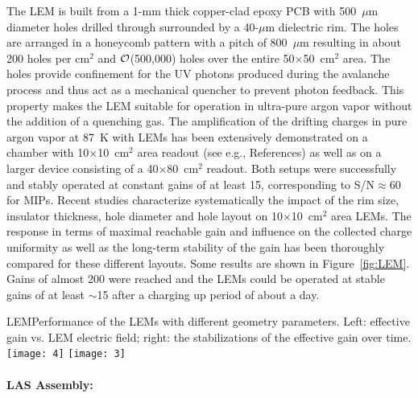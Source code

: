 The LEM is built from a 1-mm thick copper-clad epoxy PCB with
500~$\mu$m diameter holes drilled through surrounded by a
40-$\mu$m dielectric rim. The holes are arranged in a honeycomb
pattern with a pitch of 800~$\mu$m resulting in about 200 holes per
cm$^2$ and $\cal O$(500,000) holes over the entire 50$\times$50~cm$^2$
area. The holes provide confinement for the UV photons produced during
the avalanche process and thus act as a mechanical quencher to prevent
photon feedback. This property makes the LEM suitable for operation in
ultra-pure argon vapor without the addition of a quenching gas. The
amplification of the drifting charges in pure argon vapor at 87~K with
LEMs has been extensively demonstrated on a chamber with
10$\times$10~cm$^2$ area readout (see e.g.,
References\cite{Badertscher:2008rf,Badertscher:2010fi}) as well as on
a larger device consisting of a 40$\times$80~cm$^2$
readout\cite{Badertscher:2013wm}.  Both setups were successfully and
stably operated at constant gains of at least 15, corresponding to
S/N$\approx$60 for MIPs. Recent studies\cite{Cantini:2014xza}
characterize systematically the impact of the rim size, insulator
thickness, hole diameter and hole layout on 10$\times$10~cm$^2$ area
LEMs. The response in terms of maximal reachable gain and influence on
the collected charge uniformity as well as the long-term stability of
the gain has been thoroughly compared for these different
layouts. Some results are shown in Figure~\ref{fig:LEM}.  Gains of
almost 200 were reached and the LEMs could be operated at stable gains
of at least $\sim$15 after a charging up period of about a day.
\begin{cdrfigure}{LEM}{Performance of the LEMs with different geometry parameters. Left: effective gain vs. LEM electric field; right: the stabilizations of the effective gain over time.}
\texttt{[image: 4]}
\texttt{[image: 3]}
\end{cdrfigure}

\paragraph{LAS Assembly:}

